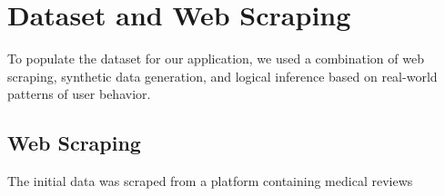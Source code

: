 \section{Dataset and Web Scraping}
To populate the dataset for our application, we used a combination of web scraping, synthetic data generation, and logical inference based on real-world patterns of user behavior.

\subsection{Web Scraping}
The initial data was scraped from a platform containing medical reviews
